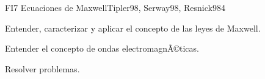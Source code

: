 \begin{syllabus}
\begin{unit}{FI7 Ecuaciones de Maxwell}{Tipler98, Serway98, Resnick98}{4}
   \begin{unitgoals}
         \item  Entender, caracterizar y aplicar el concepto de las leyes de Maxwell.
         \item  Entender el concepto de ondas electromagnÃ©ticas.
         \item  Resolver problemas.
   \end{unitgoals}
\end{unit}

\begin{coursebibliography}
\end{coursebibliography}

\end{syllabus}
